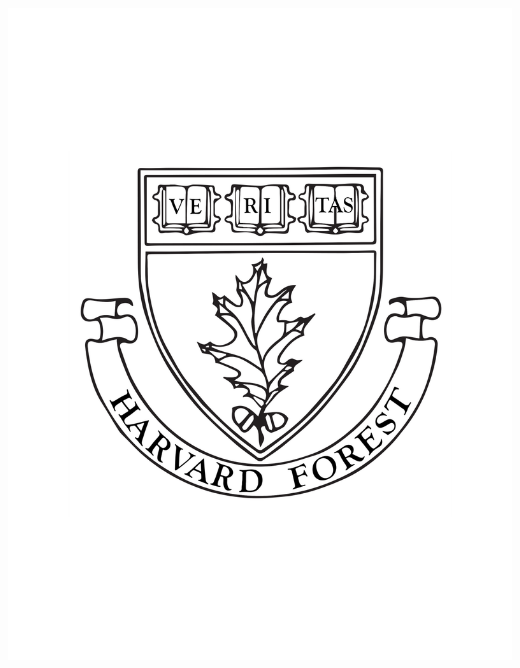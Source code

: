 \documentclass[a0,landscape]{a0poster}
\begin{document}
\begin{minipage}[t]{0.12\linewidth}
\includegraphics[width=17cm]{hf.pdf} %
\end{minipage}

\vspace{3cm} %

\end{document}
